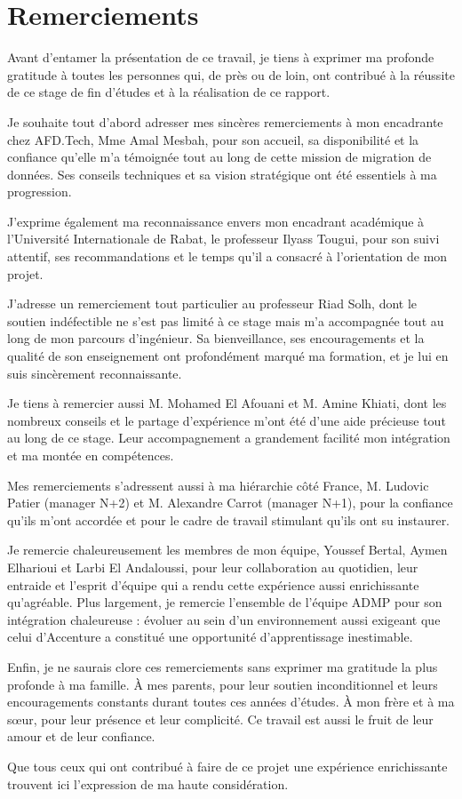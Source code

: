 \section*{Remerciements}

Avant d'entamer la présentation de ce travail, je tiens à exprimer ma profonde gratitude à toutes les personnes qui, de près ou de loin, ont contribué à la réussite de ce stage de fin d'études et à la réalisation de ce rapport.

Je souhaite tout d'abord adresser mes sincères remerciements à mon encadrante chez AFD.Tech, Mme Amal Mesbah, pour son accueil, sa disponibilité et la confiance qu'elle m'a témoignée tout au long de cette mission de migration de données. Ses conseils techniques et sa vision stratégique ont été essentiels à ma progression.

J'exprime également ma reconnaissance envers mon encadrant académique à l'Université Internationale de Rabat, le professeur Ilyass Tougui, pour son suivi attentif, ses recommandations et le temps qu'il a consacré à l'orientation de mon projet.

J'adresse un remerciement tout particulier au professeur Riad Solh, dont le soutien indéfectible ne s'est pas limité à ce stage mais m'a accompagnée tout au long de mon parcours d'ingénieur. Sa bienveillance, ses encouragements et la qualité de son enseignement ont profondément marqué ma formation, et je lui en suis sincèrement reconnaissante.

Je tiens à remercier aussi M. Mohamed El Afouani et M. Amine Khiati, dont les nombreux conseils et le partage d'expérience m'ont été d'une aide précieuse tout au long de ce stage. Leur accompagnement a grandement facilité mon intégration et ma montée en compétences.

Mes remerciements s'adressent aussi à ma hiérarchie côté France, M. Ludovic Patier (manager N+2) et M. Alexandre Carrot (manager N+1), pour la confiance qu'ils m'ont accordée et pour le cadre de travail stimulant qu'ils ont su instaurer.

Je remercie chaleureusement les membres de mon équipe, Youssef Bertal, Aymen Elharioui et Larbi El Andaloussi, pour leur collaboration au quotidien, leur entraide et l'esprit d'équipe qui a rendu cette expérience aussi enrichissante qu'agréable. Plus largement, je remercie l'ensemble de l'équipe ADMP pour son intégration chaleureuse : évoluer au sein d'un environnement aussi exigeant que celui d'Accenture a constitué une opportunité d'apprentissage inestimable.

Enfin, je ne saurais clore ces remerciements sans exprimer ma gratitude la plus profonde à ma famille. À mes parents, pour leur soutien inconditionnel et leurs encouragements constants durant toutes ces années d'études. À mon frère et à ma sœur, pour leur présence et leur complicité. Ce travail est aussi le fruit de leur amour et de leur confiance.

Que tous ceux qui ont contribué à faire de ce projet une expérience enrichissante trouvent ici l'expression de ma haute considération.